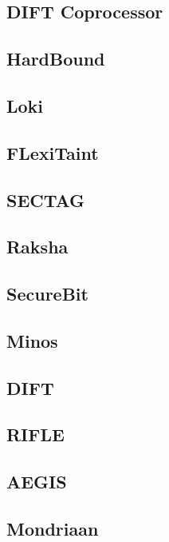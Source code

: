 \subsection{DIFT Coprocessor}

\subsection{HardBound}

\subsection{Loki}

\subsection{FLexiTaint}

\subsection{SECTAG}

\subsection{Raksha}

\subsection{SecureBit}

\subsection{Minos}

\subsection{DIFT}

\subsection{RIFLE}

\subsection{AEGIS}

\subsection{Mondriaan}

